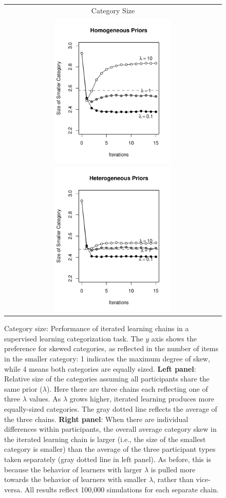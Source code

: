 \documentclass[doc]{apa6}
\begin{document}
\begin{figure}[t]
\begin{center}
\begin{tabular}{c}
\textsf{Category Size} \\
\includegraphics[width=6cm]{catsizepure.pdf} \includegraphics[width=6cm]{catsizemixed.pdf}
\end{tabular}
\caption{\small{Category size: Performance of iterated learning chains in a supervised learning categorization task. The $y$ axis shows the preference for skewed categories, as reflected in the number of items in the smaller category: 1 indicates the maximum degree of skew, while 4 means both categories are equally sized. {\bf Left panel}: Relative size of the categories assuming all participants share the same prior ($\lambda$). Here there are three chains each reflecting one of three $\lambda$ values. As $\lambda$ grows higher, iterated learning produces more equally-sized categories. The gray dotted line reflects the average of the three chains. {\bf Right panel}: When there are individual differences within participants, the overall average category skew in the iterated learning chain is larger (i.e., the size of the smallest category is smaller) than the average of the three participant types taken separately (gray dotted line in left panel). As before, this is because the behavior of learners with larger $\lambda$ is pulled more towards the behavior of learners with smaller $\lambda$, rather than vice-versa. All results reflect 100,000 simulations for each separate chain.}}
\label{catsize}
\end{center}
\end{figure}
\end{document}
